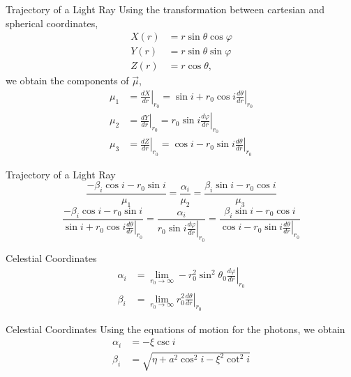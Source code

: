 \documentclass{beamer}
\begin{document}
\begin{darkframes}
\begin{frame}{Trajectory of a Light Ray}
	Using the transformation between cartesian and spherical coordinates,
	\footnotesize
	\begin{align*}
	X(r) &= r \sin \theta \cos \varphi\\
	Y(r) &= r \sin \theta \sin \varphi\\
	Z(r) &= r \cos \theta,
	\end{align*}
	\normalsize
	we obtain the components of $\vec{\mu}$,
	\footnotesize
	\begin{align*}
	\mu_1 &=  \left. \frac{dX}{dr}\right|_{r_0} = \sin i + r_0 \cos i \left. \frac{d \theta}{dr}\right|_{r_0}\\
	\mu_2 &=  \left. \frac{dY}{dr}\right|_{r_0} = r_0 \sin i \left. \frac{d \varphi}{dr}\right|_{r_0}\\
	\mu_3 &=  \left. \frac{dZ}{dr}\right|_{r_0} = \cos i - r_0 \sin i \left. \frac{d \theta}{dr}\right|_{r_0}
	\end{align*}
\end{frame}

\begin{frame}{Trajectory of a Light Ray}
	\[ \frac{-\beta_i \cos i-r_0 \sin i}{\mu_1} = \frac{\alpha_i}{\mu_2} = \frac{\beta_i \sin i-r_0 \cos i}{\mu_3}\]
	\bigskip
	\pause
	\[ \frac{-\beta_i \cos i-r_0 \sin i}{\sin i + r_0 \cos i \left. \frac{d \theta}{dr}\right|_{r_0}} = \frac{\alpha_i}{r_0 \sin i \left. \frac{d \varphi}{dr}\right|_{r_0}} = \frac{\beta_i \sin i-r_0 \cos i}{\cos i - r_0 \sin i \left. \frac{d \theta}{dr}\right|_{r_0}}\]
\end{frame}

\begin{frame}{Celestial Coordinates}
	\begin{align*}
	\alpha_i &= \lim_{r_0 \rightarrow \infty} -r_0^2 \sin^2 \theta_0 \left. \frac{d\varphi}{dr}\right|_{r_0}\\	
	\beta_i &= \lim_{r_0 \rightarrow \infty} r_0^2 \left. \frac{d\theta}{dr}\right|_{r_0}
	\end{align*}
\end{frame}

\begin{frame}{Celestial Coordinates}
Using the equations of motion for the photons, we obtain
	\begin{align*}
	\alpha_i &= -\xi \csc i\\	
	\beta_i &= \sqrt{\eta + a^2 \cos^2 i - \xi^2 \cot^2 i}
	\end{align*}
\end{frame}

  
  \end{darkframes}
\end{document}
